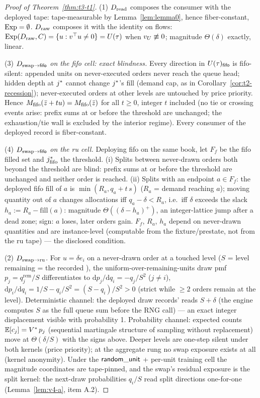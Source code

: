 \begin{proof}[Proof of Theorem~\ref{thm:t3-t1}]
(1) $D_{\mathrm{read}}$ composes the consumer with the deployed tape: tape-measurable
by Lemma~\ref{lem:lemma0}, hence fiber-constant, $\operatorname{Exp} = \emptyset$.
$D_{\mathrm{raw}}$ composes it with the identity on flows:
$\operatorname{Exp}(D_{\mathrm{raw}}, C) = \{u : v^{\top}u \ne 0\} = U(\tau)$ when
$v_{U} \not\equiv 0$; magnitude $\Theta(\delta)$ exactly, linear.

(3) \emph{$D_{\mathrm{swap}\to\mathsf{fifo}}$ on the fifo cell: exact blindness.} Every direction
in $U(\tau)_{\mathsf{fifo}}$ is fifo-silent: appended units on never-executed orders
never reach the queue head; hidden depth at $j^{*}$ cannot change
$j^{*}$'s fill (demand cap, as in Corollary~\ref{cor:t2-recession});
never-executed orders at other levels are untouched by price priority. Hence
$M_{\mathrm{fifo}}(\bar{z} + tu) = M_{\mathrm{fifo}}(\bar{z})$ for all $t \ge 0$,
integer $t$ included (no tie or crossing events arise: prefix sums at or
before the threshold are unchanged; the exhaustion/tie wall is excluded by
the interior regime). Every consumer of the deployed record is
fiber-constant.

(4) \emph{$D_{\mathrm{swap}\to\mathsf{fifo}}$ on the ru cell.} Deploying fifo on the same book, let
$F_f$ be the fifo filled set and $j^{*}_{\mathrm{fifo}}$ the threshold.
(i) Splits between never-drawn orders both beyond the threshold are blind:
prefix sums at or before the threshold are unchanged and neither order is
reached. (ii) Splits with an endpoint $a \in F_f$: the deployed fifo fill of
$a$ is $\min(R_a, q_a + t\,s)$ ($R_a$ = demand reaching $a$); moving
quantity out of $a$ changes allocations iff $q_a - \delta < R_a$, i.e.\
iff $\delta$ exceeds the slack $h_a := R_a - \mathrm{fill}(a)$: magnitude
$\Theta((\delta - h_a)^{+})$, an integer-lattice jump after a dead zone;
sign: $a$ loses, later orders gain. $F_f$, $R_a$, $h_a$ depend on
never-drawn quantities and are instance-level (computable from the
fixture/prestate, not from the ru tape) --- the disclosed condition.

(2) \emph{$D_{\mathrm{swap}\to\mathrm{ru}}$.} For $u = \delta e_i$ on a never-drawn order at a
touched level ($S$ = level remaining = the recorded
), the uniform-over-remaining-units draw pmf
$p_j = q_j^{\mathrm{rem}}/S$ differentiates to
$\mathrm{d}p_j/\mathrm{d}q_i = -q_j/S^2$ ($j \ne i$),
$\mathrm{d}p_i/\mathrm{d}q_i = 1/S - q_i/S^2 = (S - q_i)/S^2 > 0$ (strict
while $\ge 2$ orders remain at the level). Deterministic channel: the
deployed draw records' \fld{eligible\_units} reads $S + \delta$ (the engine
computes $S$ as the full queue sum before the RNG call) --- an exact integer
displacement visible with probability 1. Probability channel: expected
counts $\mathbb{E}[c_j] = V^{*}\,p_j$ (sequential martingale structure of
sampling without replacement) move at $\Theta(\delta/S)$ with the signs
above. Deeper levels are one-step silent under both kernels (price
priority); at the aggregate rung no swap exposure exists at all (kernel
anonymity). Under the $\mathsf{random\_unit}$ + per-unit training cell the magnitude
coordinates are tape-pinned, and the swap's residual exposure is the split
kernel: the next-draw probabilities $q_i/S$ read split directions
one-for-one (Lemma~\ref{lem:v4-a}, item A.2).


\end{proof}
